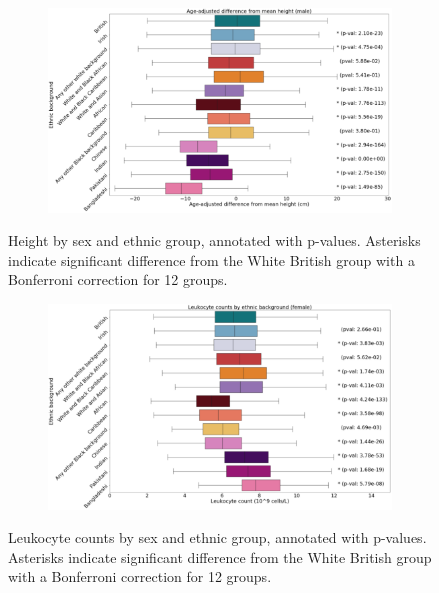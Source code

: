 \documentclass[12pt]{pnas-new}
\begin{document}
\begin{figure}
    \centering
    \begin{subfigure}{\textwidth}
    \includegraphics[width=\textwidth]{images/male_height_boxplot_annotated.pdf}
    \end{subfigure}
    \caption{Height by sex and ethnic group, annotated with p-values. Asterisks indicate significant difference from the White British group with a Bonferroni correction for 12 groups.}
    \label{fig:supp_box_height_m}
\end{figure}

\begin{figure}
    \centering
    \begin{subfigure}{\textwidth}
    \includegraphics[width=\textwidth]{images/female_leukocyte_boxplot_annotated.pdf}
    \end{subfigure}
    \caption{Leukocyte counts by sex and ethnic group, annotated with p-values. Asterisks indicate significant difference from the White British group with a Bonferroni correction for 12 groups.}
    \label{fig:supp_box_leukocyte_f}
\end{figure}
\end{document}
